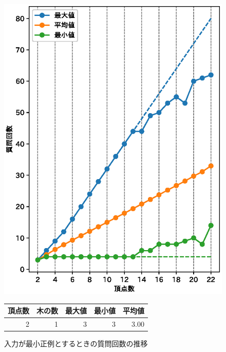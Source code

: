 \begin{figure}[tb]
  \begin{center}
    \includegraphics[scale=0.7]{fig/fig-qltimes_input_min.eps}
    \caption{入力が最小正例とするときの質問回数の推移}\label{fig:qltimes_input_min}
  \vspace*{10.5pt}
    \label{tbl:qltimes_input_min}
    \begin{tabular}{rrrrr} \hline
      頂点数 &  木の数 & 最大値 & 最小値 & 平均値 \\ \hline\hline
          2 &      1 &     3 &     3 &  3.00 \\

\end{tabular}
\end{center}
\end{figure}
